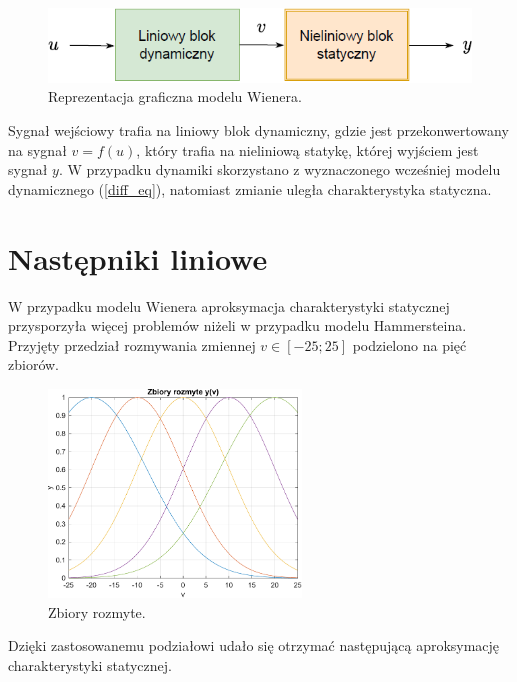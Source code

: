 \documentclass[a4paper,titlepage,11pt,floatssmall]{mwrep}
\begin{document}
\begin{figure}[h!]
\centering
\includegraphics[width=\textwidth]{pictures/wien_model}
\caption{Reprezentacja graficzna modelu Wienera.}
\end{figure}

Sygnał wejściowy trafia na liniowy blok dynamiczny, gdzie jest przekonwertowany na sygnał $v = f(u)$, który trafia na nieliniową statykę, której wyjściem jest sygnał $y$. W przypadku dynamiki skorzystano z wyznaczonego wcześniej modelu dynamicznego (\ref{diff_eq}), natomiast zmianie uległa charakterystyka statyczna.

\section{Następniki liniowe}
W przypadku modelu Wienera aproksymacja charakterystyki statycznej przysporzyła więcej problemów niżeli w przypadku modelu Hammersteina. Przyjęty przedział rozmywania zmiennej $v \in [-25;25]$ podzielono na pięć zbiorów.

\begin{figure}[h!]
\centering
\includegraphics[width=0.6\textwidth]{pictures/fuzzy_set_wien}
\caption{Zbiory rozmyte.}
\end{figure}

\newpage

\noindent Dzięki zastosowanemu podziałowi udało się otrzymać następującą aproksymację charakterystyki statycznej.
\end{document}
